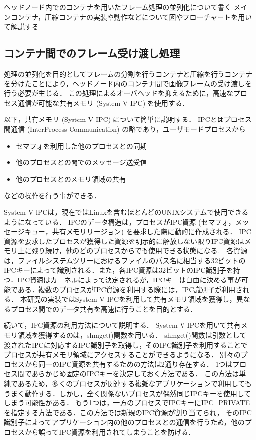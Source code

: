 ヘッドノード内でのコンテナを用いたフレーム処理の並列化について書く
メインコンテナ，圧縮コンテナの実装や動作などについて図やフローチャートを用いて解説する

\subsection*{コンテナ間でのフレーム受け渡し処理}

処理の並列化を目的としてフレームの分割を行うコンテナと圧縮を行うコンテナを分けたことにより，ヘッドノード内のコンテナ間で画像フレームの受け渡しを行う必要が生じる．
この処理によるオーバヘッドを抑えるために，高速なプロセス通信が可能な共有メモリ (System V IPC) \cite{kerrisk2010linux,linux_kernel}を使用する．

以下，共有メモリ (System V IPC) について簡単に説明する．
IPCとはプロセス間通信 (InterProcess Communication) の略であり，ユーザモードプロセスから

\begin{itemize}
    \item セマフォを利用した他のプロセスとの同期
    \item 他のプロセスとの間でのメッセージ送受信
    \item 他のプロセスとのメモリ領域の共有
\end{itemize}

などの操作を行う事ができる．

System V IPCは，現在ではLinuxを含むほとんどのUNIXシステムで使用できるようになっている．
IPCのデータ構造は，プロセスがIPC資源 (セマフォ，メッセージキュー，共有メモリリージョン) を要求した際に動的に作成される．
IPC資源を要求したプロセスが獲得した資源を明示的に解放しない限りIPC資源はメモリ上に残り続け，他のどのプロセスからでも使用できる状態になる．
各資源は，ファイルシステムツリーにおけるファイルのパス名に相当する32ビットのIPCキーによって識別される．また，各IPC資源は32ビットのIPC識別子を持つ．IPC資源はカーネルによって決定されるが，IPCキーは自由に決める事が可能である．複数のプロセスがIPC資源を利用する際には，IPC識別子が利用される．
本研究の実装ではSystem V IPCを利用して共有メモリ領域を獲得し，異なるプロセス間でのデータ共有を高速に行うことを目的とする．

続いて，IPC資源の利用方法について説明する．
System V IPCを用いて共有メモリ領域を獲得するのは，shmget()関数を用いる．
shmget()関数は引数として渡されたIPCに対応するIPC識別子を取得し，そのIPC識別子を利用することでプロセスが共有メモリ領域にアクセスすることができるようになる．
別々のプロセスから同一のIPC資源を共有するための方法は2通り存在する．
1つはプロセス間であらかじめ固定のIPCキーを決定しておく方法である．
この方法は単純であるため，多くのプロセスが関連する複雑なアプリケーションで利用してもうまく動作する．しかし，全く関係ないプロセスが偶然同じIPCキーを使用してしまう可能性がある．
もう1つは，一方のプロセスでIPCキーにIPC\_PRIVATEを指定する方法である．この方法では新規のIPC資源が割り当てられ， そのIPC識別子によってアプリケーション内の他のプロセスとの通信を行うため，他のプロセスから誤ってIPC資源を利用されてしまうことを防げる．

